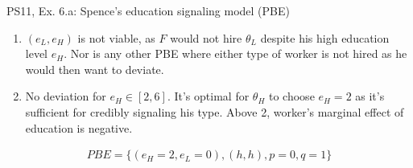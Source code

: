 \begin{frame}{PS11, Ex. 6.a: Spence’s education signaling model (PBE)}
\begin{multicols}{2}
      \begin{enumerate}
        \item $(e_L,e_H)$ is not viable, as $F$ would not hire $\theta_L$ despite his high education level $e_H$. Nor is any other PBE where either type of worker is not hired as he would then want to deviate.
        \item No deviation for $e_H\in[2,6]$. It's optimal for $\theta_H$ to choose $e_H=2$ as it's sufficient for credibly signaling his type. Above 2, worker's marginal effect of education is negative.
      \end{enumerate}\vspace{-12pt}
      \begin{align*}
        PBE=\{(e_H=2,e_L=0),(h,h),p=0,q=1\}
      \end{align*}
      \vfill\null
    \end{multicols}
\end{frame}

